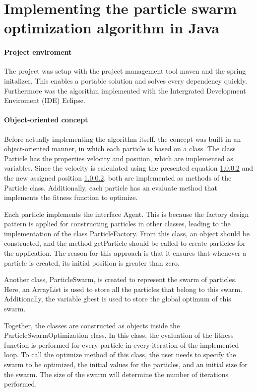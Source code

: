 \section{Implementing the particle swarm optimization algorithm in Java}
\paragraph{Project enviroment}
The project was setup with the project management tool maven and the spring initalizer.
This enables a portable solution and solves every dependency quickly.
Furthermore was the algorithm implemented with the Intergrated Development Enviroment (IDE)
Eclipse. 

\paragraph{Object-oriented concept}
Before actually implementing the algorithm itself, 
the concept was built in an object-oriented manner, in which each particle is based on a 
class. The class Particle has the properties velocity and position, which are implemented 
as variables. Since the velocity is calculated using the presented equation \ref{} and the
 new assigned position \ref{}, both are implemented as methods of the Particle class. 
 Additionally, each particle has an evaluate method that implements the fitness function 
 to optimize.

Each particle implements the interface Agent. This is because the factory design pattern 
is applied for constructing particles in other classes, leading to the implementation of 
the class ParticleFactory. From this class, an object should be constructed, and the 
method getParticle should be called to create particles for the application. The reason 
for this approach is that it ensures that whenever a particle is created, its initial 
position is greater than zero. %

Another class, ParticleSwarm, is created to represent the swarm of particles. Here, an 
ArrayList is used to store all the particles that belong to this swarm. Additionally, 
the variable gbest is used to store the global optimum of this swarm.

Together, the classes are constructed as objects inside the ParticleSwarmOptimization 
class. In this class, the evaluation of the fitness function is performed for every 
particle in every iteration of the implemented loop.
To call the optimize method of this class, the user needs to specify the swarm to be 
optimized, the initial values for the particles, and an initial size for the swarm. The 
size of the swarm will determine the number of iterations performed.

